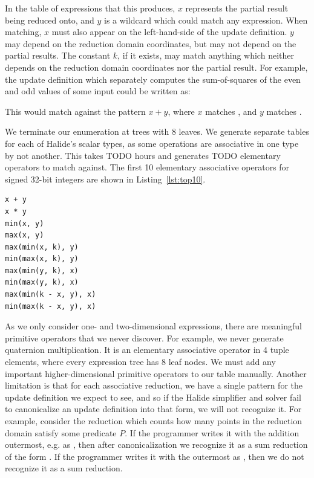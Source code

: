 In the table of expressions that this produces, $x$ represents the partial result being reduced onto, and $y$ is a wildcard which could match any expression. When matching, $x$ must also appear on the left-hand-side of the update definition. $y$ may depend on the reduction domain coordinates, but may not depend on the partial results. The constant $k$, if it exists, may match anything which neither depends on the reduction domain coordinates nor the partial result. For example, the update definition which separately computes the sum-of-squares of the even and odd values of some input  could be written as:


This would match against the pattern $x + y$, where $x$ matches , and $y$ matches .

We terminate our enumeration at trees with 8 leaves. We generate separate tables for each of Halide's scalar types, as some operations are associative in one type by not another. This takes TODO hours and generates TODO elementary operators to match against. The first 10 elementary associative operators for signed 32-bit integers are shown in Listing~\ref{lst:top10}.

\begin{lstlisting}[caption={The first 10 elementary associative operators for 32-bit signed integers}, label={lst:top10}]
x + y
x * y
min(x, y)
max(x, y)
max(min(x, k), y)
min(max(x, k), y)
max(min(y, k), x)
min(max(y, k), x)
max(min(k - x, y), x)
min(max(k - x, y), x)
\end{lstlisting}

As we only consider one- and two-dimensional expressions, there are meaningful primitive operators that we never discover. For example, we never generate quaternion multiplication. It is an elementary associative operator in 4 tuple elements, where every expression tree has 8 leaf nodes. We must add any important higher-dimensional primitive operators to our table manually. Another limitation is that for each associative reduction, we have a single pattern for the update definition we expect to see, and so if the Halide simplifier and solver fail to canonicalize an update definition into that form, we will not recognize it. For example, consider the reduction which counts how many points in the reduction domain satisfy some predicate $P$. If the programmer writes it with the addition outermost, e.g. as , then after canonicalization we recognize it as a sum reduction of the form . If the programmer writes it with the  outermost as , then we do not recognize it as a sum reduction.

